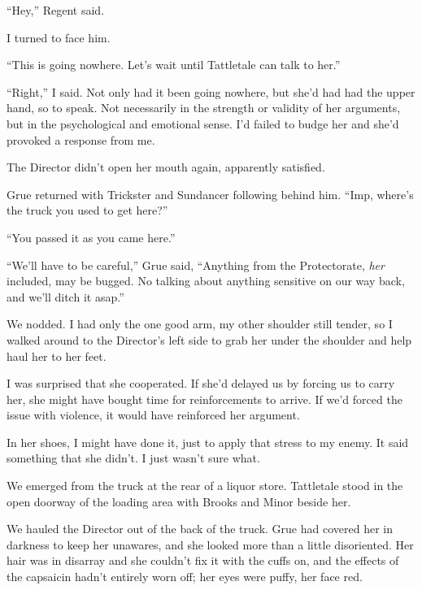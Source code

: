 ``Hey,'' Regent said.



I turned to face him.



``This is going nowhere.  Let's wait until Tattletale can talk to her.''



``Right,'' I said.  Not only had it been going nowhere, but she'd had had the upper hand, so to speak.  Not necessarily in the strength or validity of her arguments, but in the psychological and emotional sense.  I'd failed to budge her and she'd provoked a response from me.



The Director didn't open her mouth again, apparently satisfied.



Grue returned with Trickster and Sundancer following behind him.  ``Imp, where's the truck you used to get here?''



``You passed it as you came here.''



``We'll have to be careful,'' Grue said,  ``Anything from the Protectorate, \emph{her} included, may be bugged.  No talking about anything sensitive on our way back, and we'll ditch it asap.''



We nodded.  I had only the one good arm, my other shoulder still tender, so I walked around to the Director's left side to grab her under the shoulder and help haul her to her feet.



I was surprised that she cooperated.  If she'd delayed us by forcing us to carry her, she might have bought time for reinforcements to arrive.  If we'd forced the issue with violence, it would have reinforced her argument.



In her shoes, I might have done it, just to apply that stress to my enemy.  It said something that she didn't.  I just wasn't sure what.



\blacksquare



We emerged from the truck at the rear of a liquor store.  Tattletale stood in the open doorway of the loading area with Brooks and Minor beside her.



We hauled the Director out of the back of the truck.  Grue had covered her in darkness to keep her unawares, and she looked more than a little disoriented.  Her hair was in disarray and she couldn't fix it with the cuffs on, and the effects of the capsaicin hadn't entirely worn off; her eyes were puffy, her face red.



